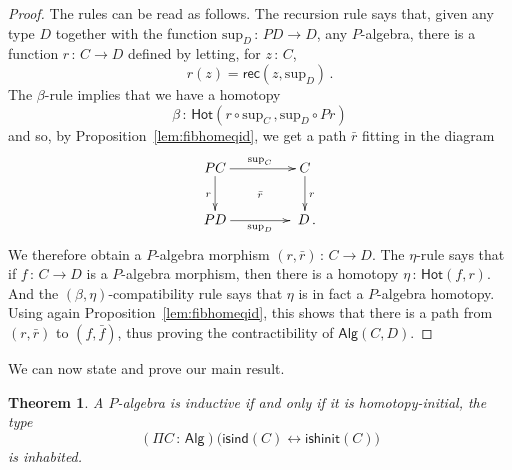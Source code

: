 \documentclass[10pt,a4paper,oneside,reqno]{amsart}
\numberwithin{equation}{section}
\theoremstyle{mythm}
\newtheorem{theorem}{Theorem}[subsection]
\theoremstyle{mydef}
\theoremstyle{myrmk}
\newcommand{\ie}{\text{i.e.\ }}
\newcommand{\co}{\,{:}\,}
\newcommand{\isalgind}{\mathsf{isind}}
\newcommand{\isalghinit}{\mathsf{ishinit}}
\newcommand{\Hot}{\mathsf{Hot}}
\newcommand{\rec}{\mathsf{rec}}
\newcommand{\Palg}{\mathsf{Alg}}
\renewcommand{\sup}{\mathrm{sup}}
\begin{document}
\begin{proof} The rules can be read as follows. The recursion rule says that, given any type $D$ together 
with the function $\sup_D \co PD \to D$, \ie any $P$-algebra, there is a function $r \co C \to D$
defined by letting,  for $z \co C$, 
\[
r(z) = \rec(z, \sup_D) \, .
\]
The $\beta$-rule implies that we have a homotopy 
\[
\beta \co \Hot( r \circ \sup_C \, , \sup_D \circ Pr)
\]
and so, by Proposition~\ref{lem:fibhomeqid}, we get a path $\bar{r}$ fitting in the diagram
\[
\xymatrix@C=1.5cm{
PC \ar[d]_{r} \ar[r]^{\sup_C} \ar@{}[dr]|{\bar{r}} & C \ar[d]^{r} \\
PD \ar[r]_{\sup_D} & \; D \, .}
\]
We therefore obtain a $P$-algebra morphism  $(r, \bar{r}) \co C \to D$.  The 
$\eta$-rule says that if $f \co C \to D$ is a $P$-algebra morphism, then there is a homotopy $\eta \co
\Hot( f, r)$.  
And the $(\beta,\eta)$-compatibility rule says that $\eta$ is in fact a $P$-algebra homotopy. Using again 
Proposition~\ref{lem:fibhomeqid}, this shows that there is a path from $(r, \bar{r})$ to $(f, \bar{f})$, thus
proving the contractibility of $\Palg(C,D)$.
\end{proof}



We can now state and prove our main result. 

\begin{theorem}\label{thm:WMain} A $P$-algebra is inductive if and only if
it is homotopy-initial, \ie the type
\[ 
(\Pi C \co \Palg) \big( \isalgind(C) \leftrightarrow \isalghinit(C) \big)
\]
is inhabited. 
\end{theorem}
\end{document}
